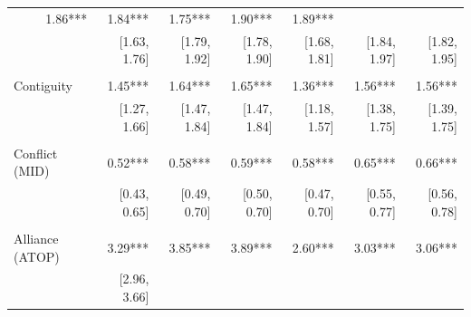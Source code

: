 \begin{table}[!h]
\begin{tabular}{lllllll}
  \multicolumn{1}{r}{1.86***} &
  \multicolumn{1}{r}{1.84***} &
  \multicolumn{1}{r}{1.75***} &
  \multicolumn{1}{r}{1.90***} &
  \multicolumn{1}{r}{1.89***} \\
\multicolumn{1}{l}{} &
  \multicolumn{1}{|r}{[1.63,    1.76]} &
  \multicolumn{1}{r}{[1.79,    1.92]} &
  \multicolumn{1}{r}{[1.78,    1.90]} &
  \multicolumn{1}{r}{[1.68,    1.81]} &
  \multicolumn{1}{r}{[1.84,    1.97]} &
  \multicolumn{1}{r}{[1.82,    1.95]} \\
\multicolumn{1}{l}{} &
  \multicolumn{1}{|r}{} &
  \multicolumn{1}{r}{} &
  \multicolumn{1}{r}{} &
  \multicolumn{1}{r}{} &
  \multicolumn{1}{r}{} &
  \multicolumn{1}{r}{} \\
\multicolumn{1}{l}{Contiguity} &
  \multicolumn{1}{|r}{1.45***} &
  \multicolumn{1}{r}{1.64***} &
  \multicolumn{1}{r}{1.65***} &
  \multicolumn{1}{r}{1.36***} &
  \multicolumn{1}{r}{1.56***} &
  \multicolumn{1}{r}{1.56***} \\
\multicolumn{1}{l}{} &
  \multicolumn{1}{|r}{[1.27,    1.66]} &
  \multicolumn{1}{r}{[1.47,    1.84]} &
  \multicolumn{1}{r}{[1.47,    1.84]} &
  \multicolumn{1}{r}{[1.18,    1.57]} &
  \multicolumn{1}{r}{[1.38,    1.75]} &
  \multicolumn{1}{r}{[1.39,    1.75]} \\
\multicolumn{1}{l}{} &
  \multicolumn{1}{|r}{} &
  \multicolumn{1}{r}{} &
  \multicolumn{1}{r}{} &
  \multicolumn{1}{r}{} &
  \multicolumn{1}{r}{} &
  \multicolumn{1}{r}{} \\
\multicolumn{1}{l}{Conflict (MID)} &
  \multicolumn{1}{|r}{0.52***} &
  \multicolumn{1}{r}{0.58***} &
  \multicolumn{1}{r}{0.59***} &
  \multicolumn{1}{r}{0.58***} &
  \multicolumn{1}{r}{0.65***} &
  \multicolumn{1}{r}{0.66***} \\
\multicolumn{1}{l}{} &
  \multicolumn{1}{|r}{[0.43,    0.65]} &
  \multicolumn{1}{r}{[0.49,    0.70]} &
  \multicolumn{1}{r}{[0.50,    0.70]} &
  \multicolumn{1}{r}{[0.47,    0.70]} &
  \multicolumn{1}{r}{[0.55,    0.77]} &
  \multicolumn{1}{r}{[0.56,    0.78]} \\
\multicolumn{1}{l}{} &
  \multicolumn{1}{|r}{} &
  \multicolumn{1}{r}{} &
  \multicolumn{1}{r}{} &
  \multicolumn{1}{r}{} &
  \multicolumn{1}{r}{} &
  \multicolumn{1}{r}{} \\
\multicolumn{1}{l}{Alliance (ATOP)} &
  \multicolumn{1}{|r}{3.29***} &
  \multicolumn{1}{r}{3.85***} &
  \multicolumn{1}{r}{3.89***} &
  \multicolumn{1}{r}{2.60***} &
  \multicolumn{1}{r}{3.03***} &
  \multicolumn{1}{r}{3.06***} \\
\multicolumn{1}{l}{} &
  \multicolumn{1}{|r}{[2.96,    3.66]} &

\end{tabular}
\end{table}
